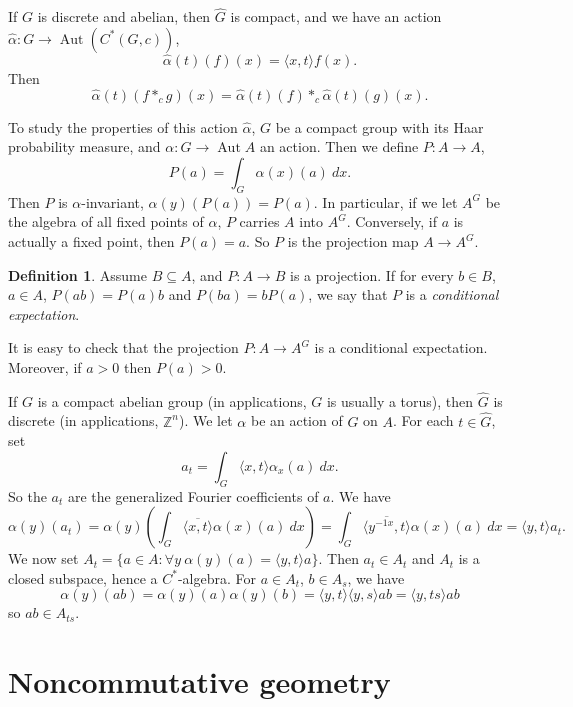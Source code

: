 \documentclass[12pt]{report}
\newcommand{\ZZ}{\mathbb{Z}}
\newcommand{\Aut}{\operatorname{Aut}}
\newcommand{\dfn}[1]{\emph{#1}\index{#1}}
\theoremstyle{definition}
\newtheorem{definition}[theorem]{Definition}
\begin{document}
    If $G$ is discrete and abelian, then $\hat G$ is compact, and we have an action $\hat \alpha: G \to \Aut(C^*(G, c))$,
    $$\hat \alpha(t)(f)(x) = \langle x, t\rangle f(x).$$
    Then
    $$\hat \alpha(t)(f *_c g)(x) = \hat\alpha(t)(f) *_c \hat\alpha(t)(g)(x).$$

    To study the properties of this action $\hat \alpha$, $G$ be a compact group with its Haar probability measure, and $\alpha: G \to \Aut A$ an action. Then we define $P: A \to A$,
    $$P(a) = \int_G \alpha(x)(a) ~dx.$$
    Then $P$ is $\alpha$-invariant, $\alpha(y)(P(a)) = P(a)$. In particular, if we let $A^G$ be the algebra of all fixed points of $\alpha$, $P$ carries $A$ into $A^G$. Conversely, if $a$ is actually a fixed point, then $P(a) = a$. So $P$ is the projection map $A \to A^G$.
\begin{definition}
    Assume $B \subseteq A$, and $P: A \to B$ is a projection. If for every $b \in B$, $a \in A$, $P(ab) = P(a)b$ and $P(ba) = bP(a)$, we say that $P$ is a \dfn{conditional expectation}.
\end{definition}
    It is easy to check that the projection $P: A \to A^G$ is a conditional expectation. Moreover, if $a > 0$ then $P(a) > 0$.

    If $G$ is a compact abelian group (in applications, $G$ is usually a torus), then $\hat G$ is discrete (in applications, $\ZZ^n$). We let $\alpha$ be an action of $G$ on $A$. For each $t \in \hat G$, set
    $$a_t = \int_G \langle x, t\rangle \alpha_x(a) ~dx.$$
    So the $a_t$ are the generalized Fourier coefficients of $a$. We have
    $$\alpha(y)(a_t) = \alpha(y)\left(\int_G \overline{\langle x, t\rangle} \alpha(x)(a) ~dx\right) = \int_G \overline{\langle y^{-1x}, t\rangle} \alpha(x)(a) ~dx = \langle y, t\rangle a_t.$$
    We now set $A_t = \{a \in A: \forall y ~\alpha(y)(a) = \langle y, t\rangle a\}$. Then $a_t \in A_t$ and $A_t$ is a closed subspace, hence a $C^*$-algebra. For $a \in A_t$, $b \in A_s$, we have
    $$\alpha(y)(ab) = \alpha(y)(a)\alpha(y)(b) = \langle y, t\rangle \langle y, s\rangle ab = \langle y, ts\rangle ab$$
    so $ab \in A_{ts}$.

\chapter{Noncommutative geometry}
\end{document}

